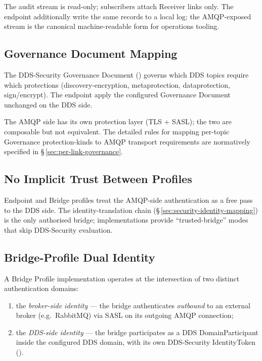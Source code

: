 \documentclass{../styles/zerodds-vendor-spec}
\begin{document}
The audit stream is read-only; subscribers  attach
Receiver links only. The endpoint  additionally write
the same records to a local log; the AMQP-exposed stream is
the canonical machine-readable form for operations tooling.

\subsection{Governance Document Mapping}\label{sec:security-governance}

The DDS-Security Governance Document
() governs which DDS
topics require which protections (discovery-encryption,
metaprotection, dataprotection, sign/encrypt). The endpoint
 apply the configured Governance Document
unchanged on the DDS side.

The AMQP side has its own protection layer (TLS + SASL); the
two are composable but not equivalent. The detailed rules for
mapping per-topic Governance protection-kinds to AMQP transport
requirements are normatively specified in
\S\,\ref{sec:per-link-governance}.

\subsection{No Implicit Trust Between Profiles}

Endpoint and Bridge profiles  treat the AMQP-side
authentication as a free pass to the DDS side. The
identity-translation chain
(\S\,\ref{sec:security-identity-mapping}) is the only authorised
bridge; implementations  provide
``trusted-bridge'' modes that skip DDS-Security evaluation.

\subsection{Bridge-Profile Dual Identity}\label{sec:bridge-dual-identity}

A Bridge Profile implementation operates at the intersection of
two distinct authentication domains:

\begin{enumerate}
  \item the \emph{broker-side identity} — the bridge authenticates
        \emph{outbound} to an external broker (e.g.\ RabbitMQ)
        via SASL on its outgoing AMQP connection;
  \item the \emph{DDS-side identity} — the bridge participates as
        a DDS DomainParticipant inside the configured DDS
        domain, with its own DDS-Security IdentityToken
        ().
\end{enumerate}
\end{document}
